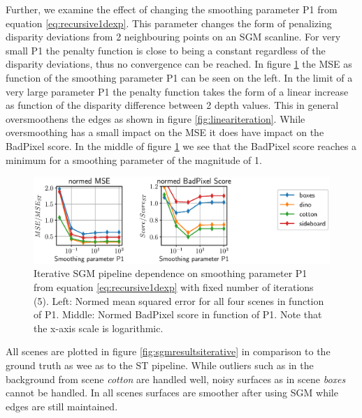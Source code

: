 \documentclass  [
  paper    = a4,
  BCOR     = 10mm,
  twoside,
  fontsize = 12pt,
  fleqn,
  toc      = bibnumbered,
  toc      = listofnumbered,
  numbers  = noendperiod,
  headings = normal,
  listof   = leveldown,
  version  = 3.03
]                                       {scrreprt}
\begin{document}
Further, we examine the effect of changing the smoothing parameter P1 from equation \ref{eq:recursive1dexp}. This parameter changes the form of penalizing disparity deviations from 2 neighbouring points on an SGM scanline. For very small P1 the penalty function is close to being a constant regardless of the disparity deviations, thus no convergence can be reached. In figure \ref{fig:chooselowersgmpprmergeiterationsexppenalty1} the MSE as function of the smoothing parameter P1 can be seen on the left. In the limit of a very large parameter P1 the penalty function takes the form of a linear increase as function of the disparity difference between 2 depth values. This in general oversmoothens the edges as shown in figure \ref{fig:lineariteration}. While oversmoothing has a small impact on the MSE it does have impact on the BadPixel score. In the middle of figure \ref{fig:chooselowersgmpprmergeiterationsexppenalty1} we see that the BadPixel score reaches a minimum for a smoothing parameter of the magnitude of 1.\\
\begin{figure}[h!]
	\centering
	\includegraphics[width=1\linewidth]{images/choose_lower_sgm_ppr_merge_iterations_exp_penalty1}
	\caption[Iterative SGM dependence on smoothing parameter]{Iterative SGM pipeline dependence on smoothing parameter P1 from equation \ref{eq:recursive1dexp} with fixed number of iterations (5). Left: Normed mean squared error for all four scenes in function of P1. Middle: Normed BadPixel score in function of P1. Note that the x-axis scale is logarithmic.}
	\label{fig:chooselowersgmpprmergeiterationsexppenalty1}
\end{figure}
All scenes are plotted in figure \ref{fig:sgmresultsiterative} in comparison to the ground truth as wee as to the ST pipeline. While outliers such as in the background from scene \textit{cotton} are handled well, noisy surfaces as in scene \textit{boxes} cannot be handled. In all scenes surfaces are smoother after using SGM while edges are still maintained.
\end{document}
